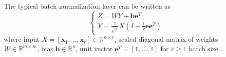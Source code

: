 \documentclass{article}
\begin{document}
The typical batch normalization layer can be written as
\begin{equation}
\left\{
\begin{array}{l}
Z = WY +\textbf{b}\textbf{e}^{T} \\
Y = \frac{1}{\sqrt{r}}X(I - \frac{1}{r}\textbf{e}\textbf{e}^T)
\end{array}
\right.
\label{eq:normalization}
\end{equation}
where input $X = [\textbf{x}_1,...,\textbf{x}_r] \in \mathbb{R}^{n \times r}$, scaled diagonal matrix of weights $W \in \mathbb{R}^{m \times m}$, bias $\textbf{b} \in \mathbb{R}^n$, unit vector $\textbf{e}^{T}=[1,...,1]$ for $r \ge 1$ batch size \cite{Devarakonda2017}.
\end{document}
